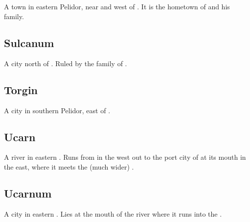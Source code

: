 \subsection{\Redglen}
\index{\Redglen}
A town in eastern Pelidor, near  and west of . 
It is the hometown of  and his family. 









\subsection{Sulcanum}
A city north of \Malcur. 
Ruled by the family of . 









\subsection{Torgin}
A city in southern Pelidor, east of \Redglen. 









\subsection{Ucarn}
A river in eastern . 
Runs from  in the west out to the port city of  at its mouth in the east, where it meets the (much wider) . 









\subsection{Ucarnum}
A city in eastern . 
Lies at the mouth of the river  where it runs into the . 















